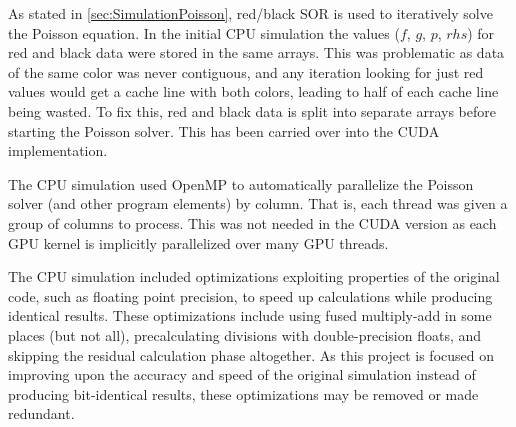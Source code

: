 As stated in \cref{sec:SimulationPoisson}, red/black SOR is used to iteratively solve the Poisson equation.
In the initial CPU simulation the values ($f$, $g$, $p$, $rhs$) for red and black data were stored in the same arrays.
This was problematic as data of the same color was never contiguous, and any iteration looking for just red values would get a cache line with both colors, leading to half of each cache line being wasted.
To fix this, red and black data is split into separate arrays before starting the Poisson solver.
This has been carried over into the CUDA implementation.

The CPU simulation used OpenMP\cite{OpenMPHomeOpenMP} to automatically parallelize the Poisson solver (and other program elements) by column.
That is, each thread was given a group of columns to process.
This was not needed in the CUDA version as each GPU kernel is implicitly parallelized over many GPU threads.

The CPU simulation included optimizations exploiting properties of the original code, such as floating point precision, to speed up calculations while producing identical results.
These optimizations include using fused multiply-add\cite{Muller2010TheInstruction} in some places (but not all), precalculating divisions with double-precision floats, and skipping the residual calculation phase altogether.
As this project is focused on improving upon the accuracy and speed of the original simulation instead of producing bit-identical results, these optimizations may be removed or made redundant.




